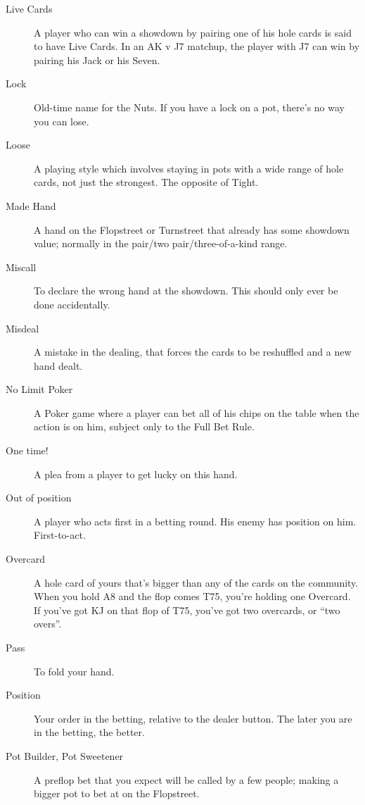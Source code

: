 \begin{description}
\item[Live Cards] A player who can win a showdown by pairing one of
his hole cards is said to have Live Cards. In an AK v J7 matchup, the
player with J7 can win by pairing his Jack or his Seven.

\item[Lock] Old-time name for the Nuts. If you have a lock on a pot,
there's no way you can lose.

\item[Loose] A playing style which involves staying in pots with a
wide range of hole cards, not just the strongest. The opposite of
Tight.

\item[Made Hand] A hand on the Flopstreet or Turnstreet that already
has some showdown value; normally in the pair/two pair/three-of-a-kind
range.

\item[Miscall] To declare the wrong hand at the showdown. This should
only ever be done accidentally.

\item[Misdeal] A mistake in the dealing, that forces the cards to be
reshuffled and a new hand dealt.

\item[No Limit Poker] A Poker game where a player can bet all of his
chips on the table when the action is on him, subject only to the Full
Bet Rule.

\item[One time!] A plea from a player to get lucky on this hand.

\item[Out of position] A player who acts first in a betting round. His
enemy has position on him. First-to-act.

\item[Overcard] A hole card of yours that's bigger than any of the
cards on the community. When you hold A8 and the flop comes T75,
you're holding one Overcard. If you've got KJ on that flop of T75,
you've got two overcards, or ``two overs''.

\item[Pass] To fold your hand.

\item[Position] Your order in the betting, relative to the dealer
button. The later you are in the betting, the better.

\item[Pot Builder, Pot Sweetener] A preflop bet that you expect will
be called by a few people; making a bigger pot to bet at on the
Flopstreet.


\end{description}
